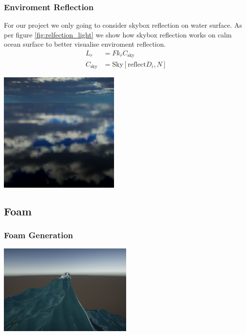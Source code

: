 \subsubsection{Enviroment Reflection}
For our project we only going to consider skybox reflection on water surface. As per figure \ref{fig:relfection_light} we show how skybox reflection works on calm ocean surface to better visualise enviroment reflection. 
\begin{equation}
    \begin{split}
        L_r &= F k_r C_{\text{sky}}\\
        C_{\text{sky}} &= \text{Sky}[\text{reflect}{D_i, N}]
    \end{split}
\end{equation}
\begin{minipage}{1\textwidth}
    \centering
    \includegraphics[width=0.45\textwidth]{"images/reflection_light.png"}
    \label{fig:relfection_light}
\end{minipage}

\subsection{Foam}
\subsubsection{Foam Generation}
\begin{minipage}{1\textwidth}
    \centering
    \includegraphics[width=0.50\textwidth]{"images/wave_curl.png"}
    \label{fig:wave_curl}
\end{minipage}

